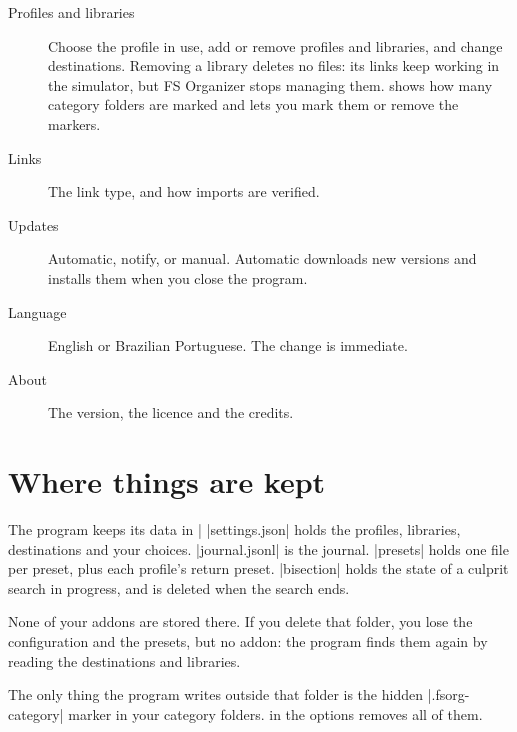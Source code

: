 \documentclass[11pt,a4paper]{article}
\begin{document}
\begin{description}
  \item[Profiles and libraries] Choose the profile in use, add or remove
    profiles and libraries, and change destinations. Removing a library deletes
    no files: its links keep working in the simulator, but FS Organizer stops
    managing them.  shows how many category folders are marked
    and lets you mark them or remove the markers.
  \item[Links] The link type, and how imports are verified.
  \item[Updates] Automatic, notify, or manual. Automatic downloads new versions
    and installs them when you close the program.
  \item[Language] English or Brazilian Portuguese. The change is immediate.
  \item[About] The version, the licence and the credits.
\end{description}

\section{Where things are kept}

The program keeps its data in \where|%
\where|settings.json| holds the profiles, libraries, destinations and your
choices. \where|journal\operations.jsonl| is the journal. \where|presets| holds
one file per preset, plus each profile's return preset. \where|bisection| holds
the state of a culprit search in progress, and is deleted when the search ends.

None of your addons are stored there. If you delete that folder, you lose the
configuration and the presets, but no addon: the program finds them again by
reading the destinations and libraries.

The only thing the program writes outside that folder is the hidden
\where|.fsorg-category| marker in your category folders.  in
the options removes all of them.
\end{document}
